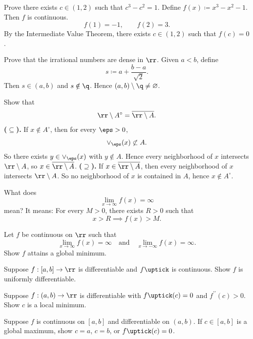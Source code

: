 \begin{problem}{
    Prove there exists $c\in(1,2)$ such that $c^3 - c^2 = 1$.
}
    Define $f(x) \coloneqq x^3 - x^2 - 1$.
    Then $f$ is continuous.
    \[
        f(1) = -1, \qquad f(2) = 3.
    \]
    By the Intermediate Value Theorem, there exists $c\in(1,2)$ such that $f(c)=0$.
\end{problem}

\begin{problem}{
    Prove that the irrational numbers are dense in $\rr$.
}
    Given $a<b$, define
    \[
        s \coloneqq a + \dfrac{b-a}{\sqrt{2}}.
    \]
    Then $s\in(a,b)$ and $s\notin\q$.
    Hence $(a,b)\setminus\q \neq \varnothing$.
\end{problem}

\begin{problem}{
    Show that
    \[
        \rr \setminus A^{\circ} = \overline{\rr \setminus A}.
    \]
}
    \textbf{($\subseteq$).}
    If $x\notin A^{\circ}$, then for every $\eps>0$,
    \[
        \vee_\eps(x)\not\subset A.
    \]
    So there exists $y\in \vee_\eps(x)$ with $y\notin A$.
    Hence every neighborhood of $x$ intersects $\rr\setminus A$, so $x\in \overline{\rr\setminus A}$.
    \textbf{($\supseteq$).}
    If $x\in \overline{\rr\setminus A}$, then every neighborhood of $x$ intersects $\rr\setminus A$.
    So no neighborhood of $x$ is contained in $A$, hence $x\notin A^{\circ}$.
\end{problem}

\begin{problem}{
    What does
    \[
        \lim_{x\to\infty} f(x) = \infty
    \]
    mean?
}
    It means:
    For every $M > 0$, there exists $R > 0$ such that
    \[
        x > R \implies f(x) > M.
    \]
\end{problem}

\begin{example}
    Let $f$ be continuous on $\rr$ such that
    \[
        \lim_{x\to\infty} f(x) = \infty
        \quad\text{and}\quad
        \lim_{x\to -\infty} f(x) = \infty.
    \]
    Show $f$ attains a global minimum.
\end{example}

\begin{example}
    Suppose $f : [a,b]\to\rr$ is differentiable and $f\uptick$ is continuous.
    Show $f$ is uniformly differentiable.
\end{example}

\begin{example}
    Suppose $f : (a,b)\to\rr$ is differentiable with $f\uptick(c)=0$ and $f^{\prime\prime}(c)>0$.
    Show $c$ is a local minimum.
\end{example}

\begin{example}
    Suppose $f$ is continuous on $[a,b]$ and differentiable on $(a,b)$.
    If $c\in[a,b]$ is a global maximum, show $c=a$, $c=b$, or $f\uptick(c)=0$.
\end{example}